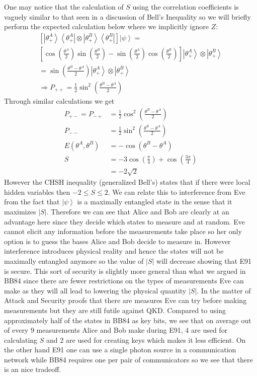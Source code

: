 \documentclass[aps,prd,final,twocolumn,letterpaper]{revtex4}
\newcommand{\bra}[1]{\left\langle #1 \right|}
\newcommand{\ket}[1]{\left|#1\right\rangle}
\begin{document}
One may notice that the calculation of $S$ using the correlation coefficients is vaguely similar to that seen in a discussion of Bell's Inequality so we will briefly perform the expected calculation below where we implicitly ignore $Z$:
\begin{multline}
\left[\ket{\theta_{+}^A}\bra{\theta_{+}^A}\otimes \ket{\theta_{+}^B}\bra{\theta_{+}^B}\right] \ket{\psi}=\\
\left[\cos\left(\frac{\theta^A}{2}\right)\sin\left(\frac{\theta^B}{2}\right)-\right. 
\left. \sin\left(\frac{\theta^A}{2}\right)\cos\left(\frac{\theta^B}{2}\right)\right]
\ket{\theta_{+}^A}\otimes \ket{\theta_{+}^B}
\\ =  \sin\left(\frac{\theta^B-\theta^A}{2}\right)\ket{\theta_{+}^A}\otimes\ket{\theta_{+}^B}\\
\Rightarrow P_{++} = \frac{1}{2}\sin^2\left(\frac{\theta^B-\theta^A}{2}\right)
\end{multline}
Through similar calculations we get 
\begin{align}
P_{+-} =P_{-+}&= \frac{1}{2}\cos^2\left(\frac{\theta^B-\theta^A}{2}\right)\\ P_{--} &= \frac{1}{2}\sin^2\left(\frac{\theta^B-\theta^A}{2}\right)\\
E(\theta^A, \theta^B) &= -\cos(\theta^B-\theta^A)\\
 S &= -3\cos(\frac{\pi}{4})+\cos(\frac{3\pi}{4})\nonumber\\
&= -2\sqrt{2}
\end{align}
However the CHSH inequality (generalized Bell's) states that if there were local hidden variables then $-2\leq S \leq 2$. We can relate this to interference from Eve from the fact that $\ket{\psi}$ is a maximally entangled state in the sense that it maximizes $|S|$. Therefore we can see that Alice and Bob are clearly at an advantage here since they decide which states to measure and at random. Eve cannot elicit any information before the measurements take place so her only option is to guess the bases Alice and Bob decide to measure in. However interference introduces physical reality and hence the states will not be maximally entangled anymore so the value of $|S|$ will decrease showing that E91 is secure. This sort of security is slightly more general than what we argued in BB84 since there are fewer restrictions on the types of measurements Eve can make as they will all lead to lowering the physical quantity $|S|$. In the matter of Attack and Security proofs that there are measures Eve can try before making measurements but they are still futile against QKD. Compared to using approximately half of the states in BB84 as key bits, we see that on average out of every $9$ measurements Alice and Bob make during E91, $4$ are used for calculating $S$ and $2$ are used for creating keys which makes it  less efficient. On the other hand E91 one can use a single photon source in a communication network while BB84 requires one per pair of communicators so we see that there is an nice tradeoff. 
\end{document}
